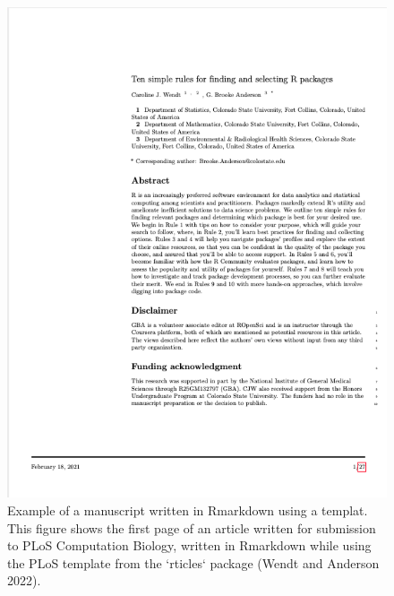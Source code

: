 \documentclass[]{tufte-book}
\begin{document}
\begin{figure}
\includegraphics[width=\textwidth]{figures/rticles_example} \caption[Example of a manuscript written in Rmarkdown using a templat]{Example of a manuscript written in Rmarkdown using a templat. This figure shows the first page of an article written for submission to PLoS Computation Biology, written in Rmarkdown while using the PLoS template from the `rticles` package (Wendt and Anderson 2022).}\label{fig:rticleexample}
\end{figure}
\end{document}
